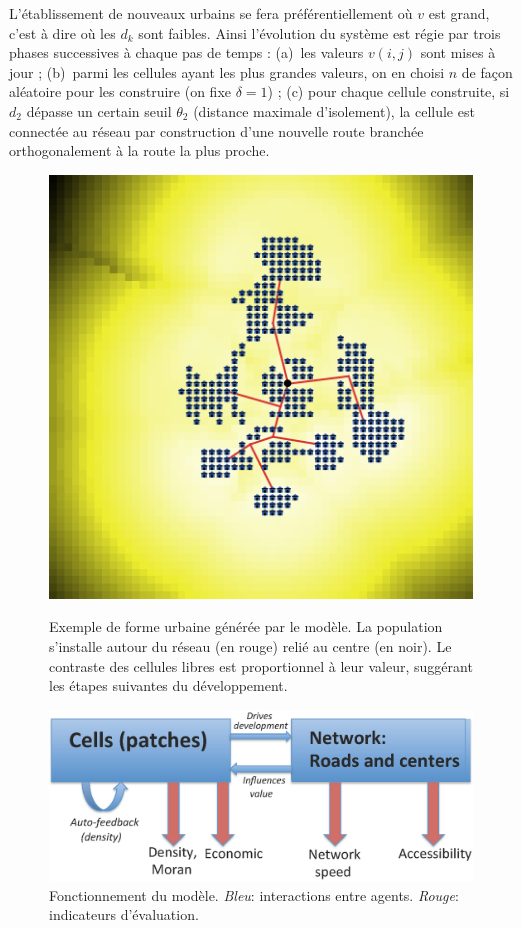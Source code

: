 \documentclass[french,12pt]{article}
\begin{document}
\noindent L’établissement de nouveaux urbains se fera préférentiellement où $v$ est grand, c’est à dire où les $d_k$ sont faibles. Ainsi l’évolution du système est régie par trois phases successives à chaque pas de temps  : (a)~les valeurs $v(i,j)$ sont mises à jour ; (b)~parmi les cellules ayant les plus grandes valeurs, on en choisi $n$ de façon aléatoire pour les construire (on fixe $\delta=1$) ; (c) pour chaque cellule construite, si $d_2$ dépasse un certain seuil $\theta_2$ (distance maximale d’isolement), la cellule est connectée au réseau par construction d’une nouvelle route branchée orthogonalement à la route la plus proche.



\begin{figure}
\centering
\includegraphics[width=0.65\columnwidth]{figures/lattice}
\caption{\small Exemple de forme urbaine générée par le modèle. La population s’installe autour du réseau (en rouge) relié au centre (en noir). Le contraste des cellules libres est proportionnel à leur valeur, suggérant les étapes suivantes du développement.}
\label{fig_lattice}
\vspace{1cm}
\includegraphics[width=0.8\columnwidth]{figures/flowchart}
\caption{\small Fonctionnement du modèle. \emph{Bleu}: interactions entre agents. \emph{Rouge}: indicateurs d’évaluation.}
\label{fig_flowchart}
\end{figure}
\end{document}
